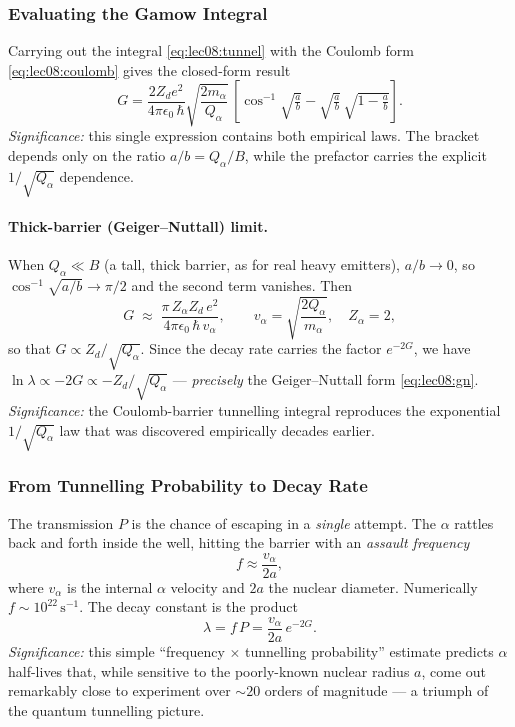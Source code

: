\subsubsection*{Evaluating the Gamow Integral}
Carrying out the integral \eqref{eq:lec08:tunnel} with the Coulomb form
\eqref{eq:lec08:coulomb} gives the closed-form result
\begin{equation}
  \label{eq:lec08:G_full}
  \boxed{G = \frac{2 Z_d e^2}{4\pi\epsilon_0\,\hbar}
            \sqrt{\frac{2 m_\alpha}{Q_\alpha}}\,
            \left[\cos^{-1}\!\sqrt{\tfrac{a}{b}}
                  - \sqrt{\tfrac{a}{b}}\,\sqrt{1 - \tfrac{a}{b}}\right].}
\end{equation}
\textit{Significance:} this single expression contains both empirical laws.  The
bracket depends only on the ratio $a/b = Q_\alpha/B$, while the prefactor carries
the explicit $1/\sqrt{Q_\alpha}$ dependence.

\paragraph{Thick-barrier (Geiger--Nuttall) limit.}
When $Q_\alpha \ll B$ (a tall, thick barrier, as for real heavy emitters),
$a/b \to 0$, so $\cos^{-1}\sqrt{a/b} \to \pi/2$ and the second term vanishes.
Then
\begin{equation}
  \label{eq:lec08:G_limit}
  G \;\approx\; \frac{\pi\,Z_\alpha Z_d\, e^2}{4\pi\epsilon_0\,\hbar\, v_\alpha},
  \qquad v_\alpha = \sqrt{\frac{2Q_\alpha}{m_\alpha}},\quad Z_\alpha = 2,
\end{equation}
so that $G \propto Z_d/\sqrt{Q_\alpha}$.  Since the decay rate carries the factor
$e^{-2G}$, we have $\ln\lambda \propto -2G \propto -Z_d/\sqrt{Q_\alpha}$ ---
\emph{precisely} the Geiger--Nuttall form \eqref{eq:lec08:gn}.
\textit{Significance:} the Coulomb-barrier tunnelling integral reproduces the
exponential $1/\sqrt{Q_\alpha}$ law that was discovered empirically decades
earlier.

\subsubsection*{From Tunnelling Probability to Decay Rate}
The transmission $P$ is the chance of escaping in a \emph{single} attempt.  The
$\alpha$ rattles back and forth inside the well, hitting the barrier with an
\emph{assault frequency}
\begin{equation}
  \label{eq:lec08:freq}
  f \approx \frac{v_\alpha}{2a},
\end{equation}
where $v_\alpha$ is the internal $\alpha$ velocity and $2a$ the nuclear diameter.
Numerically $f \sim 10^{22}\,\text{s}^{-1}$.  The decay constant is the product
\begin{equation}
  \label{eq:lec08:lambda_alpha}
  \boxed{\lambda = f\,P = \frac{v_\alpha}{2a}\,e^{-2G}.}
\end{equation}
\textit{Significance:} this simple ``frequency $\times$ tunnelling probability''
estimate predicts $\alpha$ half-lives that, while sensitive to the poorly-known
nuclear radius $a$, come out remarkably close to experiment over $\sim 20$ orders
of magnitude --- a triumph of the quantum tunnelling picture.

